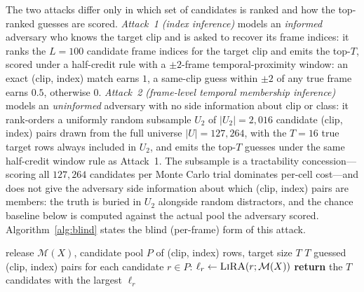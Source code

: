 \documentclass[sigconf,anonymous, review]{acmart}
\begin{document}
 The two attacks differ only in which set of candidates is ranked and how the top-ranked guesses are scored. \emph{Attack~1 (index inference)} models an \textit{informed} adversary who knows the target clip and is asked to recover its frame indices: it ranks the $L = 100$ candidate frame indices for the target clip and emits the top-$T$, scored under a half-credit rule with a $\pm 2$-frame temporal-proximity window: an exact (clip, index) match earns $1$, a same-clip guess within $\pm 2$ of any true frame earns $0.5$, otherwise $0$.
\emph{Attack~2 (frame-level temporal membership inference)} models an \textit{uninformed} adversary with no side information about clip or class: it rank-orders a uniformly random subsample $U_2$ of $|U_2| = 2{,}016$ candidate (clip, index) pairs drawn from the full universe $|U| = 127{,}264$, with the $T = 16$ true target rows always included in $U_2$, and emits the top-$T$ guesses under the same half-credit window rule as Attack~1. The subsample is a tractability concession---scoring all $127{,}264$ candidates per Monte Carlo trial dominates per-cell cost---and does not give the adversary side information about which (clip, index) pairs are members: the truth is buried in $U_2$ alongside random distractors, and the chance baseline below is computed against the actual pool the adversary scored. Algorithm~\ref{alg:blind} states the blind (per-frame) form of this attack.

\begin{algorithm}[t]
\caption{Blind temporal MIA (Attack~2, the i.i.d.\ adversary)}
\label{alg:blind}
\begin{algorithmic}[1]
\Require release $\mathcal{M}(X)$, candidate pool $P$ of (clip, index) rows, target size $T$
\Ensure  $T$ guessed (clip, index) pairs
\State for each candidate $r\in P$: $\ell_r \gets \textsc{LiRA}(r; \mathcal{M}(X))$ 
\State \textbf{return} the $T$ candidates with the largest $\ell_r$
\end{algorithmic}
\end{algorithm}

\begin{table}[t]
\centering\small
\caption{Empirical temporal membership inference scores at $(k, \sigma) = (1, 0.1)$. The Empirical column reports the mean over $n = 50$ samples, with the standard error $\mathrm{std}/\sqrt{n}$ in parentheses. Full sweep of parameters is available in Appendix~\ref{app:sigma_sweep}.}
\label{tab:operating_point}
\end{table}
\end{document}
